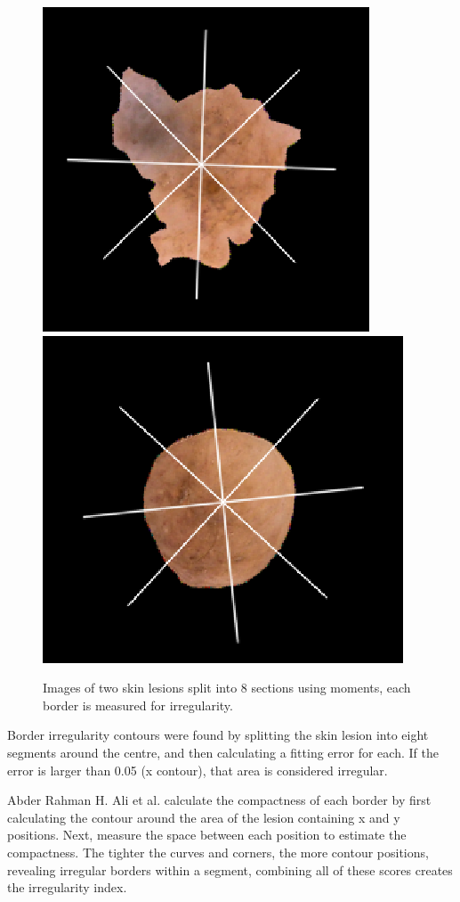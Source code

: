 \begin{figure}
\centering
\includegraphics[scale=0.5]{images/bord1.png}
\includegraphics[scale=0.5]{images/bord2.png}
\caption{Images of two skin lesions split into 8 sections using moments, each border is measured for irregularity.}
\end{figure} \label{borders}

Border irregularity contours were found by splitting the skin lesion into eight segments around the centre, and then calculating a fitting error for each. If the error is larger than 0.05 (x contour), that area is considered irregular\cite{Kasmi2016}.

Abder Rahman H. Ali et al. calculate the compactness of each border by first calculating the contour around the area of the lesion containing x and y positions. Next, measure the space between each position to estimate the compactness. The tighter the curves and corners, the more contour positions, revealing irregular borders within a segment, combining all of these scores creates the irregularity index\cite{Zaqout2016}.

